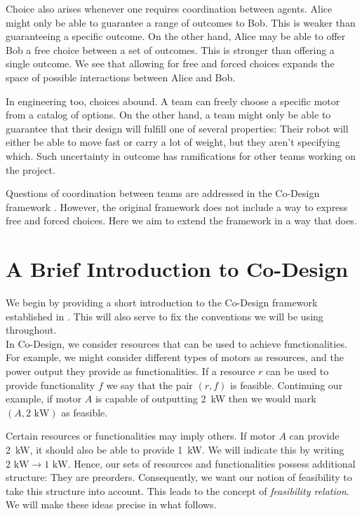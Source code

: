 \documentclass[12pt]{article}
\theoremstyle{definition}
\theoremstyle{plain}
\theoremstyle{plain}
\theoremstyle{plain}
\theoremstyle{plain}
\theoremstyle{remark}
\theoremstyle{remark}
\begin{document}
Choice also arises whenever one requires coordination between agents. Alice might only be able to guarantee a range of outcomes to Bob. This is weaker than guaranteeing a specific outcome. On the other hand, Alice may be able to offer Bob a free choice between a set of outcomes. This is stronger than offering a single outcome. We see that allowing for free and forced choices expands the space of possible interactions between Alice and Bob.

In engineering too, choices abound. A team can freely choose a specific motor from a catalog of options. On the other hand, a team might only be able to guarantee that their design will fulfill one of several properties: Their robot will either be able to move fast or carry a lot of weight, but they aren't specifying which. Such uncertainty in outcome has ramifications for other teams working on the project. 

Questions of coordination between teams are addressed in the Co-Design framework \cite{Censi2015}. However, the original framework does not include a way to express free and forced choices. Here we aim to extend the framework in a way that does. 

\section{A Brief Introduction to Co-Design}
We begin by providing a short introduction to the Co-Design framework established in \cite{Censi2015}. This will also serve to fix the conventions we will be using throughout. \\

In Co-Design, we consider resources that can be used to achieve functionalities. For example, we might consider different types of motors as resources, and the power output they provide as functionalities. If a resource $r$ can be used to provide functionality $f$ we say that the pair $(r,f)$ is feasible. Continuing our example, if motor $A$ is capable of outputting \mbox{2 kW} then we would mark $(A,\text{2 kW})$ as feasible.

Certain resources or functionalities may imply others. If motor $A$ can provide \mbox{2 kW}, it should also be able to provide \mbox{1 kW}. We will indicate this by writing $2 \text{ kW} \rightarrow 1 \text{ kW}$. Hence, our sets of resources and functionalities possess additional structure: They are preorders. Consequently, we want our notion of feasibility to take this structure into account. This leads to the concept of \emph{feasibility relation}. We will make these ideas precise in what follows.
\end{document}
